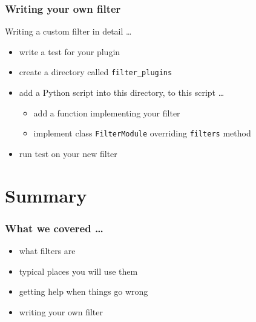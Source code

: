 \documentclass[pdf]{beamer}
\begin{document}
\begin{frame}[t,fragile]
  \frametitle{Writing your own filter}
  Writing a custom filter in detail \ldots
  \begin{itemize}
    \item {write a test for your plugin}
    \item {create a directory called \texttt{filter\_plugins}}
    \item {add a Python script into this directory, to this script \ldots}
      \begin{itemize}
        \item {add a function implementing your filter}
        \item {implement class \texttt{FilterModule} overriding \texttt{filters} method}
      \end{itemize}
    \item \alert {run test on your new filter}
  \end{itemize}
\end{frame}

\section{Summary}

\begin{frame}
  \frametitle{What we covered \ldots}
    \pause{}
  \begin{itemize}[<+->]
    \item{what filters are}
    \item{typical places you will use them}
    \item{getting help when things go wrong}
    \item{writing your own filter}
  \end{itemize}
\end{frame}
\end{document}
